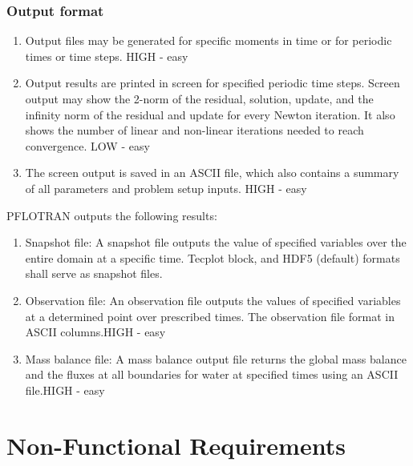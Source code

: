 \subsubsection{Output format}
\begin{enumerate}[label=UI \arabic*.,ref=UI \arabic*,nosep, resume]
	\item Output files may be generated for specific moments in time or for periodic times or time steps. \label{outputSpecs} HIGH - easy
	\item Output results are printed in screen for specified periodic time steps. Screen output may show the 2-norm of the residual, solution, update, and the infinity norm of the residual and update for every Newton iteration. It also shows the number of linear and non-linear iterations needed to reach convergence. \label{outputPrintScreen} LOW - easy
	\item The screen output is saved in an ASCII file, which also contains a summary of all parameters and problem setup inputs. \label{outputFile} HIGH - easy
\end{enumerate}

PFLOTRAN outputs the following results: 

\begin{enumerate}[label=UI \arabic*.,ref=UI \arabic*,nosep, resume]
	\item Snapshot file: \label{outSnapshot}A snapshot file outputs the value of specified variables over the entire domain at a specific time. Tecplot block, and HDF5 (default) formats shall serve as snapshot files.
	\item Observation file: \label{outObservation}An observation file outputs the values of specified variables at a determined point over prescribed times. The observation file format in ASCII columns.HIGH - easy
	\item Mass balance file: \label{outMassBalance}A mass balance output file returns the global mass balance and the fluxes at all boundaries for water at specified times using an ASCII file.HIGH - easy
\end{enumerate}

\section{Non-Functional Requirements}
